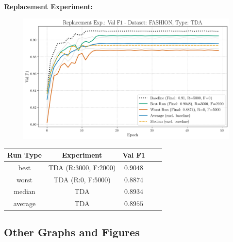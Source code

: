 \noindent\textbf{Replacement Experiment:}
\begin{figure}[htbp]
	\centering
	\includegraphics[width=.85\textwidth]{abb/strat_classifier_performance/tda_fashion_mnist/replacement_experiments/val_f1_score_tda_fashion_mnist_fashion_all.png}
	\label{fig:app_strat_class_performance_replacement_exp._val_f1_score_}
\end{figure}
\begin{table}[H]
	\centering
	\vspace{-1em}
	\begin{tabular}{|c|c|c|c|c|}
		\hline
		Run Type & Experiment & Val F1 \\ \hline
		best & TDA (R:3000, F:2000) & $0.9048$\\ \hline
		worst & TDA (R:0, F:5000) & $0.8874$\\ \hline
		median & TDA & $0.8934$\\ \hline
		average & TDA & $0.8955$
		\\ \hline
	\end{tabular}
\end{table}
\newpage

\subsection{Other Graphs and Figures}
